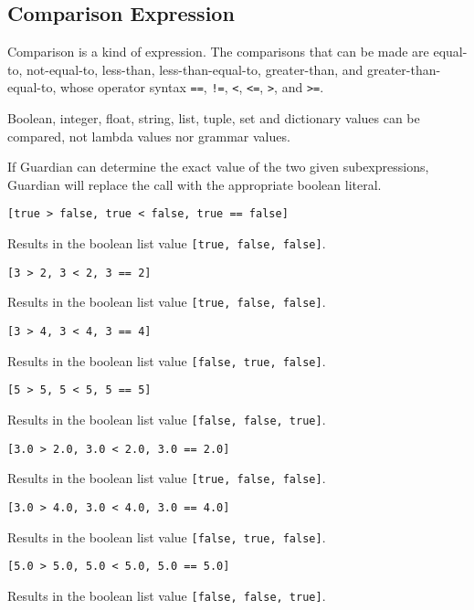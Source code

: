 
\subsection{Comparison Expression}
{
	Comparison is a kind of expression. The comparisons that can be made
	are equal-to, not-equal-to,
	less-than, less-than-equal-to,
	greater-than, and greater-than-equal-to,
	whose operator syntax
	\texttt{==}, \texttt{!=},
	\texttt{<}, \texttt{<=},
	\texttt{>}, and \texttt{>=}.
	
	Boolean, integer, float, string, list, tuple, set and dictionary values
	can be compared, not lambda values nor grammar values.
	
	If Guardian can determine the exact value of the two given subexpressions,
	Guardian will replace the call with the appropriate boolean literal.
	
	\begin{itemize}
	{
		\item[] \texttt{[true > false, true < false, true == false]}
		
			Results in the boolean list value \texttt{[true, false, false]}.
			
		\item[] \texttt{[3 > 2, 3 < 2, 3 == 2]}
		
			Results in the boolean list value \texttt{[true, false, false]}.
			
		\item[] \texttt{[3 > 4, 3 < 4, 3 == 4]}
		
			Results in the boolean list value \texttt{[false, true, false]}.
			
		\item[] \texttt{[5 > 5, 5 < 5, 5 == 5]}
		
			Results in the boolean list value \texttt{[false, false, true]}.
			
		\item[] \texttt{[3.0 > 2.0, 3.0 < 2.0, 3.0 == 2.0]}
		
			Results in the boolean list value \texttt{[true, false, false]}.
			
		\item[] \texttt{[3.0 > 4.0, 3.0 < 4.0, 3.0 == 4.0]}
		
			Results in the boolean list value \texttt{[false, true, false]}.
			
		\item[] \texttt{[5.0 > 5.0, 5.0 < 5.0, 5.0 == 5.0]}
		
			Results in the boolean list value \texttt{[false, false, true]}.
			
}
\end{itemize}}
